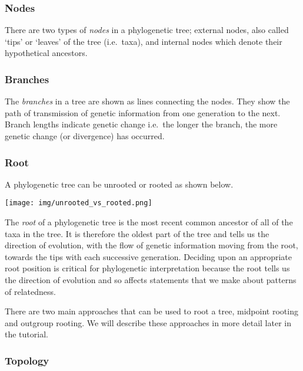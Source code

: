 \documentclass[11pt]{article}
\begin{document}
\hypertarget{nodes}{%
\subsubsection{Nodes}\label{nodes}}

There are two types of \textit{nodes} in a phylogenetic tree; external
nodes, also called `tips' or `leaves' of the tree (i.e.~taxa), and
internal nodes which denote their hypothetical ancestors.

\hypertarget{branches}{%
\subsubsection{Branches}\label{branches}}

The \textit{branches} in a tree are shown as lines connecting the nodes.
They show the path of transmission of genetic information from one
generation to the next. Branch lengths indicate genetic change i.e.~the
longer the branch, the more genetic change (or divergence) has occurred.

\hypertarget{root}{%
\subsubsection{Root}\label{root}}

A phylogenetic tree can be unrooted or rooted as shown below.


\begin{center}
\texttt{[image: img/unrooted\_vs\_rooted.png]}
\end{center}


The \textit{root} of a phylogenetic tree is the most recent common
ancestor of all of the taxa in the tree. It is therefore the oldest part
of the tree and tells us the direction of evolution, with the flow of
genetic information moving from the root, towards the tips with each
successive generation. Deciding upon an appropriate root position is
critical for phylogenetic interpretation because the root tells us the
direction of evolution and so affects statements that we make about
patterns of relatedness.

There are two main approaches that can be used to root a tree, midpoint
rooting and outgroup rooting. We will describe these approaches in more
detail later in the tutorial.

\hypertarget{topology}{%
\subsubsection{Topology}\label{topology}}
\end{document}
